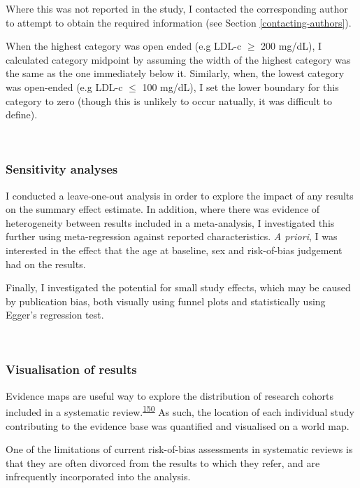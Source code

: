 \documentclass[a4paper, twoside]{templates/ociamthesis}
\begin{document}
Where this was not reported in the study, I contacted the corresponding author to attempt to obtain the required information (see Section \ref{contacting-authors}).

When the highest category was open ended (e.g LDL-c \(\geqslant\) 200 mg/dL), I calculated category midpoint by assuming the width of the highest category was the same as the one immediately below it. Similarly, when, the lowest category was open-ended (e.g LDL-c \(\leqslant\) 100 mg/dL), I set the lower boundary for this category to zero (though this is unlikely to occur natually, it was difficult to define).

~

\hypertarget{sensitivity-analyses}{%
\subsubsection{Sensitivity analyses}\label{sensitivity-analyses}}

I conducted a leave-one-out analysis in order to explore the impact of any results on the summary effect estimate. In addition, where there was evidence of heterogeneity between results included in a meta-analysis, I investigated this further using meta-regression against reported characteristics. \emph{A priori}, I was interested in the effect that the age at baseline, sex and risk-of-bias judgement had on the results.

Finally, I investigated the potential for small study effects, which may be caused by publication bias, both visually using funnel plots and statistically using Egger's regression test.

~

\hypertarget{visualisation-of-results}{%
\subsubsection{Visualisation of results}\label{visualisation-of-results}}

Evidence maps are useful way to explore the distribution of research cohorts included in a systematic review.\textsuperscript{\protect\hyperlink{ref-saran2018}{150}} As such, the location of each individual study contributing to the evidence base was quantified and visualised on a world map.

One of the limitations of current risk-of-bias assessments in systematic reviews is that they are often divorced from the results to which they refer, and are infrequently incorporated into the analysis.
\end{document}
